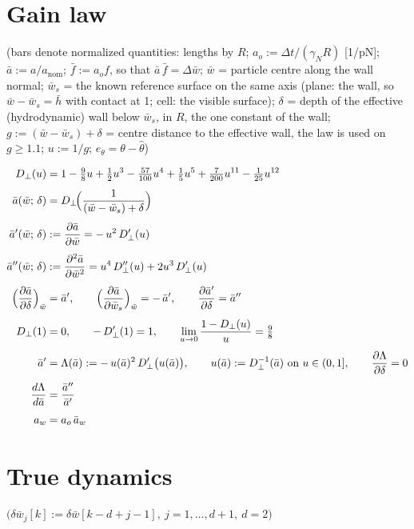 \documentclass[11pt,a4paper,fontset=none]{ctexart}
\newcommand{\ba}{\bar{a}}
\newcommand{\bw}{\bar{w}}
\newcommand{\dW}{\Delta\bw}
\newcommand{\ap}{\ba'}
\newcommand{\app}{\ba''}
\newcommand{\Dp}{D_{\perp}}
\newcommand{\dl}{\delta}
\newcommand{\lam}{\Lambda}
\begin{document}
\section{Gain law}

(bars denote normalized quantities: lengths by $R$; $a_o := \Delta t/(\gamma_N R)$ [1/pN]; $\ba := a/a_{\mathrm{nom}}$;
$\bar f := a_o f$, so that $\ba\,\bar f = \dW$; $\bw$ = particle centre along the wall normal; $\bw_s$ = the known reference
surface on the same axis (plane: the wall, so $\bw - \bw_s = \bar h$ with contact at 1; cell: the visible surface);
$\dl$ = depth of the effective (hydrodynamic) wall below $\bw_s$, in $R$, the one constant of the wall;
$g := (\bw - \bw_s) + \dl$ = centre distance to the effective wall, the law is used on $g \ge 1.1$;
$u := 1/g$; $e_\theta = \theta - \hat\theta$)

\begin{align*}
\Dp(u)                 &= 1 - \tfrac{9}{8}u + \tfrac{1}{2}u^{3} - \tfrac{57}{100}u^{4} + \tfrac{1}{5}u^{5} + \tfrac{7}{200}u^{11} - \tfrac{1}{25}u^{12} \\[4pt]
\ba(\bw;\,\dl)         &= \Dp\!\Bigl(\frac{1}{(\bw - \bw_s) + \dl}\Bigr) \\[4pt]
\ap(\bw;\,\dl)         &:= \frac{\partial\ba}{\partial\bw} = -\,u^{2}\,\Dp'(u) \\[4pt]
\app(\bw;\,\dl)        &:= \frac{\partial^{2}\ba}{\partial\bw^{2}} = u^{4}\,\Dp''(u) + 2u^{3}\,\Dp'(u) \\[4pt]
\Bigl(\frac{\partial\ba}{\partial\dl}\Bigr)_{\bw}   &= \ap, \qquad
\Bigl(\frac{\partial\ba}{\partial\bw_s}\Bigr)_{\bw} = -\,\ap, \qquad
\frac{\partial\ap}{\partial\dl} = \app \\[4pt]
\Dp(1) &= 0, \qquad -\,\Dp'(1) = 1, \qquad \lim_{u\to 0}\frac{1-\Dp(u)}{u} = \tfrac{9}{8} \\[4pt]
\ap &= \lam(\ba) := -\,u(\ba)^{2}\,\Dp'\bigl(u(\ba)\bigr), \qquad u(\ba) := \Dp^{-1}(\ba)\ \text{on } u \in (0, 1], \qquad
\frac{\partial\lam}{\partial\dl} = 0 \\[4pt]
\frac{d\lam}{d\ba} &= \frac{\app}{\ap} \\[4pt]
a_w &= a_o\,\ba_w
\end{align*}

\section{True dynamics}

$\bigl(\delta\bw_j[k] := \delta\bw[k-d+j-1],\ j = 1,\dots,d+1,\ d = 2\bigr)$
\end{document}

